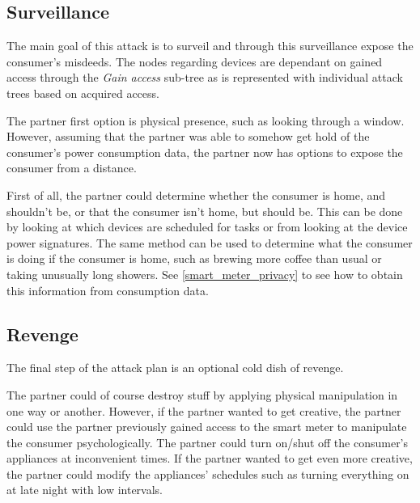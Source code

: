 \subsection{Surveillance}
The main goal of this attack is to surveil and through this surveillance expose the consumer's misdeeds.
The nodes regarding devices are dependant on gained access through the \textit{Gain access} sub-tree as is represented with individual attack trees based on acquired access.

The partner first option is physical presence, such as looking through a window.
However, assuming that the partner was able to somehow get hold of the consumer's power consumption data, the partner now has options to expose the consumer from a distance.

First of all, the partner could determine whether the consumer is home, and shouldn't be, or that the consumer isn't home, but should be.
This can be done by looking at which devices are scheduled for tasks or from looking at the device power signatures.
The same method can be used to determine what the consumer is doing if the consumer is home, such as brewing more coffee than usual or taking unusually long showers.
See \cref{smart_meter_privacy} to see how to obtain this information from consumption data.

\subsection{Revenge}
The final step of the attack plan is an optional cold dish of revenge.

The partner could of course destroy stuff by applying physical manipulation in one way or another.
However, if the partner wanted to get creative, the partner could use the partner previously gained access to the smart meter to manipulate the consumer psychologically.
The partner could turn on/shut off the consumer's appliances at inconvenient times.
If the partner wanted to get even more creative, the partner could modify the appliances' schedules such as turning everything on at late night with low intervals.
